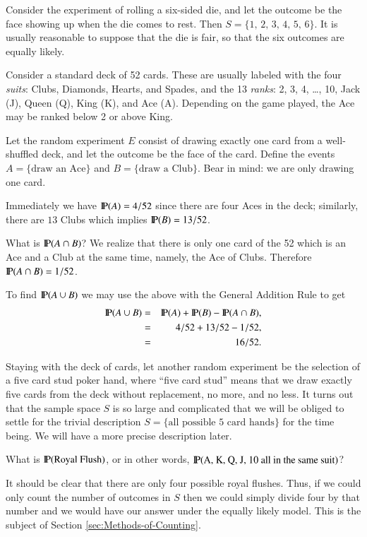 \documentclass[captions=tableheading]{scrbook}
\begin{document}
\begin{example}
Consider the experiment of rolling a six-sided die, and let the outcome be the face showing up when the die comes to rest. Then \( S = \{ 1,\,2,\,3,\,4,\,5,\,6 \} \). It is usually reasonable to suppose that the die is fair, so that the six outcomes are equally likely.
\end{example}

\begin{example}
Consider a standard deck of 52 cards. These are usually labeled with the four \emph{suits}: Clubs, Diamonds, Hearts, and Spades, and the 13 \emph{ranks}: 2, 3, 4, \ldots{}, 10, Jack (J), Queen (Q), King (K), and Ace (A). Depending on the game played, the Ace may be ranked below 2 or above King. 

Let the random experiment \(E\) consist of drawing exactly one card from a well-shuffled deck, and let the outcome be the face of the card. Define the events \( A = \{ \mbox{draw an Ace} \} \) and \( B = \{ \mbox{draw a Club} \} \). Bear in mind: we are only drawing one card.

Immediately we have \(\P(A)=4/52\) since there are four Aces in the deck; similarly, there are \(13\) Clubs which implies \(\P(B)=13/52\).

What is \(\P(A\cap B)\)? We realize that there is only one card of the 52 which is an Ace and a Club at the same time, namely, the Ace of Clubs. Therefore \(\P(A\cap B)=1/52\).

To find \(\P(A\cup B)\) we may use the above with the General Addition Rule to get
\begin{eqnarray*}
\P(A\cup B) & = & \P(A)+\P(B)-\P(A\cap B),\\
 & = & 4/52+13/52-1/52,\\
 & = & 16/52.
\end{eqnarray*}

\end{example}

\begin{example}
Staying with the deck of cards, let another random experiment be the selection of a five card stud poker hand, where ``five card stud'' means that we draw exactly five cards from the deck without replacement, no more, and no less. It turns out that the sample space \(S\) is so large and complicated that we will be obliged to settle for the trivial description \( S = \{ \mbox{all possible 5 card hands} \} \) for the time being. We will have a more precise description later.

What is \(\P(\mbox{Royal Flush})\), or in other words, \(\P(\mbox{A, K, Q, J, 10 all in the same suit})\)? 

It should be clear that there are only four possible royal flushes. Thus, if we could only count the number of outcomes in \(S\) then we could simply divide four by that number and we would have our answer under the equally likely model. This is the subject of Section \ref{sec:Methods-of-Counting}.

\end{example}
\end{document}
